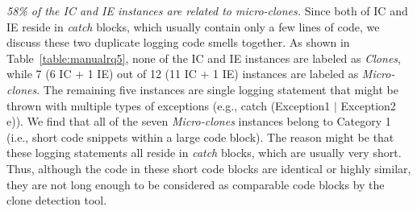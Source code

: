  {\em 58\% of the IC and IE instances are related to micro-clones.} Since both of IC and IE reside in {\em catch} blocks, which usually contain only a few lines of code, we discuss these two duplicate logging code smells together. As shown in Table~\ref{table:manualrq5}, none of the IC and IE instances are labeled as {\em Clones}, while 7 (6 IC + 1 IE) out of 12 (11 IC + 1 IE) instances are labeled as {\em Micro-clones}. The remaining five instances are single logging statement that might be thrown with multiple types of exceptions (e.g., {\sf catch (Exception1 \(|\)  Exception2 e)}). We find that all of the seven {\em Micro-clones} instances belong to Category 1 (i.e., short code snippets within a large code block). The reason might be that these logging statements all reside in {\em catch} blocks, which are usually very short. Thus, although the code in these short code blocks are identical or highly similar, they are not long enough to be considered as comparable code blocks by the clone detection tool. %


